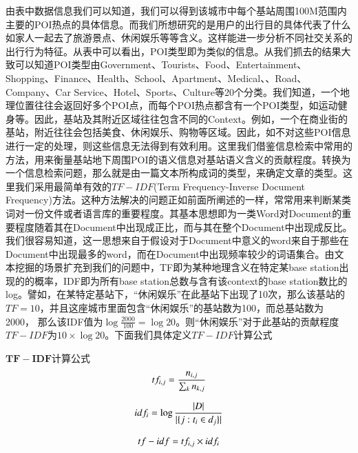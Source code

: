 由表中数据信息我们可以知道，我们可以得到该城市中每个基站周围100M范围内主要的POI热点的具体信息。而我们所想研究的是用户的出行目的具体代表了什么如家人一起去了旅游景点、休闲娱乐等等含义。这样能进一步分析不同社交关系的出行行为特征。从表中可以看出，POI类型即为类似的信息。从我们抓去的结果大致可以知道POI类型由Government、Tourists、Food、Entertainment、Shopping、Finance、Health、School、Apartment、Medical、、Road、Company、Car Service、Hotel、Sports、Culture等20个分类。我们知道，一个地理位置往往会返回好多个POI点，而每个POI热点都含有一个POI类型，如运动健身等。因此，基站及其附近区域往往包含不同的Context。例如，一个在商业街的基站，附近往往会包括美食、休闲娱乐、购物等区域。因此，如不对这些POI信息进行一定的处理，则这些信息无法得到有效利用。这里我们借鉴信息检索中常用的方法，用来衡量基站地下周围POI的语义信息对基站语义含义的贡献程度。转换为一个信息检索问题，那么就是由一篇文本所构成词的类型，来确定文章的类型。这里我们采用最简单有效的$TF-IDF$(Term Frequency-Inverse Document Frequency)方法。这种方法解决的问题正如前面所阐述的一样，常常用来判断某类词对一份文件或者语言库的重要程度。其基本思想即为一类Word对Document的重要程度随着其在Document中出现成正比，而与其在整个Document中出现成反比。我们很容易知道，这一思想来自于假设对于Document中意义的word来自于那些在Document中出现最多的word，而在Document中出现频率较少的词语集合。由文本挖掘的场景扩充到我们的问题中，TF即为某种地理含义在特定某base station出现的的概率，IDF即为所有base station总数与含有该context的base station数比的log。譬如，在某特定基站下，“休闲娱乐”在此基站下出现了10次，那么该基站的$TF = 10$，并且这座城市里面包含“休闲娱乐”的基站数为100，而总基站数为2000， 那么该IDF值为$\log{\frac{2000}{100}} = \log{20}$。则“休闲娱乐”对于此基站的贡献程度$TF-IDF$为$10 \times \log{20}$。下面我们具体定义$TF-IDF$计算公式

\begin{definition}
    \label{TF-IDF-definition}
        $\bm{TF-IDF}$计算公式
    \begin{equation}
        tf_{i,j} = \frac{n_{i,j}}{\sum_{k}{n_{k,j}}}\\
    \end{equation}

    \begin{equation}
        idf_{i} = \log{\frac{|D|}{|\{j:t_i \in d_j\}|}}\\
    \end{equation}

    \begin{equation}
        tf-idf = tf_{i,j} \times idf_{i} \\
    \end{equation}
   
\end{definition}



